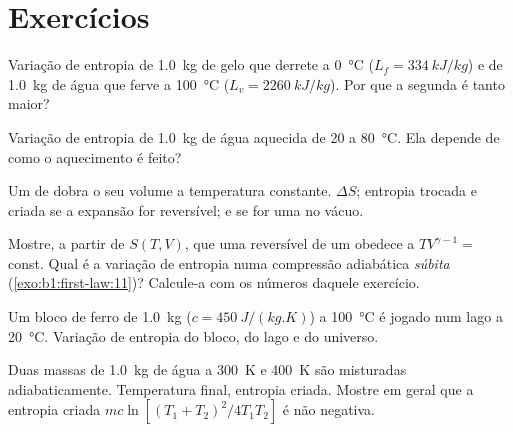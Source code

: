\section{Exercícios}

\begin{exercise}[$\star$]\label{exo:b1:second-law-entropy:1}
Variação de entropia de \qty{1.0}{kg} de gelo que derrete a \qty{0}{\degreeCelsius}
($L_f = \qty{334}{kJ/kg}$) e de \qty{1.0}{kg} de água que ferve a
\qty{100}{\degreeCelsius} ($L_v = \qty{2260}{kJ/kg}$). Por que a segunda é
tanto maior?
\end{exercise}

\begin{exercise}[$\star$]\label{exo:b1:second-law-entropy:2}
Variação de entropia de \qty{1.0}{kg} de água aquecida de \qty{20}{} a
\qty{80}{\degreeCelsius}. Ela depende de como o aquecimento é feito?
\end{exercise}

\begin{exercise}[$\star$]\label{exo:b1:second-law-entropy:3}
Um  de  dobra o seu volume a temperatura constante.
$\Delta S$; entropia trocada e criada se a expansão for reversível;
e se for uma  no vácuo.
\end{exercise}

\begin{exercise}[$\star$]\label{exo:b1:second-law-entropy:4}
Mostre, a partir de $S(T, V)$, que uma  reversível
de um  obedece a $TV^{\gamma - 1} = $ const. Qual é a variação de
entropia numa compressão adiabática \emph{súbita} (\cref{exo:b1:first-law:11})?
Calcule-a com os números daquele exercício.
\end{exercise}

\begin{exercise}[$\star\star$]\label{exo:b1:second-law-entropy:5}
Um bloco de ferro de \qty{1.0}{kg} ($c = \qty{450}{J/(kg.K)}$) a \qty{100}{\degreeCelsius}
é jogado num lago a \qty{20}{\degreeCelsius}. Variação de entropia do
bloco, do lago e do universo.
\end{exercise}

\begin{exercise}[$\star\star$]\label{exo:b1:second-law-entropy:6}
Duas massas de \qty{1.0}{kg} de água a \qty{300}{K} e \qty{400}{K} são misturadas
adiabaticamente. Temperatura final, entropia criada. Mostre em geral que
a entropia criada $mc\ln[(T_1 + T_2)^2/4T_1T_2]$ é não negativa.
\end{exercise}

